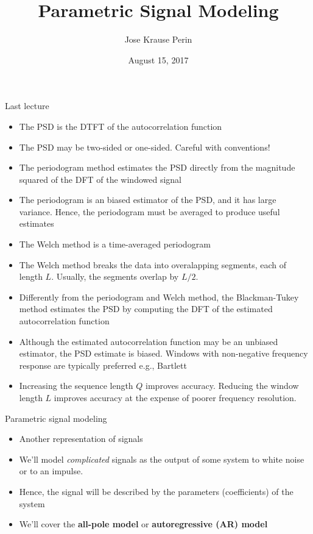 \documentclass[10pt]{beamer}
\title[EE 264]{Parametric Signal Modeling}
\author{Jose Krause Perin}
\institute{Stanford University}
\date{August 15, 2017}
\begin{document}
\begin{frame}
  \titlepage
\end{frame}

%
\begin{frame}{Last lecture}
\begin{itemize}
	\item The PSD is the DTFT of the autocorrelation function
	\item The PSD may be two-sided or one-sided. Careful with conventions!
	\item The periodogram method estimates the PSD directly from the magnitude squared of the DFT of the windowed signal
	\item The periodogram is an biased estimator of the PSD, and it has large variance. Hence, the periodogram must be averaged to produce useful estimates
	\item The Welch method is a time-averaged periodogram
	\item The Welch method breaks the data into overalapping segments, each of length $L$. Usually, the segments overlap by $L/2$.
	\item Differently from the periodogram and Welch method, the Blackman-Tukey method estimates the PSD by computing the DFT of the estimated autocorrelation function
	\item Although the estimated autocorrelation function may be an unbiased estimator, the PSD estimate is biased. Windows with non-negative frequency response are typically preferred e.g., Bartlett
	\item Increasing the sequence length $Q$ improves accuracy. Reducing the window length $L$ improves accuracy at the expense of poorer frequency resolution.
\end{itemize}
\end{frame}

%
\begin{frame}{Parametric signal modeling}
	\begin{itemize}
		\item Another representation of signals
		\item We'll model \textit{complicated} signals as the output of some system to white noise or to an impulse.
		\item Hence, the signal will be described by the parameters (coefficients) of the system
		\item We'll cover the \textbf{all-pole model} or \textbf{autoregressive (AR) model}
	\end{itemize}
\end{frame}
\end{document}
